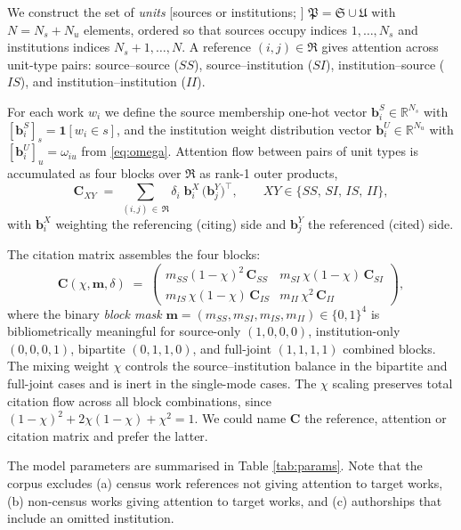 We construct the set of \emph{units} [sources or institutions; \cite{pinskiCitationInfluenceJournal1976}]
$\mathfrak{P}=\mathfrak{S}\cup\mathfrak{U}$ with $N=N_s+N_u$ elements, ordered so that
sources occupy indices $1,\dots,N_s$ and institutions indices $N_s+1,\dots,N$.
A reference $(i,j) \in \mathfrak{R}$ gives attention across unit-type pairs:
source--source ($SS$), source--institution ($SI$), institution--source ($IS$), and
institution--institution ($II$).

For each work $w_i$ we define the source membership one-hot vector
$\mathbf{b}^S_i\in\mathbb{R}^{N_s}$ with $[\mathbf{b}^S_i]_s=\mathbf{1}[w_i\in s]$,
and the institution weight distribution vector
$\mathbf{b}^U_i\in\mathbb{R}^{N_u}$ with $[\mathbf{b}^U_i]_u=\omega_{iu}$
from \eqref{eq:omega}.
Attention flow between pairs of unit types is accumulated as four blocks over $\mathfrak{R}$ as rank-1 outer products,
\begin{equation}
	\mathbf{C}_{XY} \;=\; \sum_{(i,j)\,\in\,\mathfrak{R}}
	\delta_i\;\mathbf{b}^X_i\,\bigl(\mathbf{b}^Y_j\bigr)^\top,
	\qquad XY\in\{SS,\,SI,\,IS,\,II\},
	\label{eq:Cblock}
\end{equation}
with $\mathbf{b}^X_i$ weighting the referencing (citing) side and $\mathbf{b}^Y_j$ the referenced (cited) side.

The citation matrix assembles the four blocks:
\begin{equation}
	\mathbf{C}(\chi,\mathbf{m},\delta) \;=\;
	\begin{pmatrix}
		m_{SS}(1-\chi)^2\,\mathbf{C}_{SS} &
		m_{SI}\,\chi(1-\chi)\,\mathbf{C}_{SI} \\[4pt]
		m_{IS}\,\chi(1-\chi)\,\mathbf{C}_{IS} &
		m_{II}\,\chi^2\,\mathbf{C}_{II}
	\end{pmatrix},
	\label{eq:C}
\end{equation}
where the binary \textit{block mask} $\mathbf{m}=(m_{SS},m_{SI},m_{IS},m_{II})\in\{0,1\}^4$
is bibliometrically meaningful for
source-only $(1,0,0,0)$, institution-only $(0,0,0,1)$,
bipartite $(0,1,1,0)$, and full-joint $(1,1,1,1)$ combined blocks.
The mixing weight $\chi$ controls the source--institution balance
in the bipartite and full-joint cases and is inert in the single-mode cases.
The $\chi$ scaling preserves total citation flow across all block combinations,
since $(1-\chi)^2+2\chi(1-\chi)+\chi^2=1$.
We could name $\mathbf{C}$ the reference, attention or citation matrix and prefer the latter.

The model parameters are summarised in Table \ref{tab:params}. Note that the corpus excludes (a) census work references not giving attention to  target works, (b) non-census works giving attention to target works, and (c) authorships that include an omitted institution.

